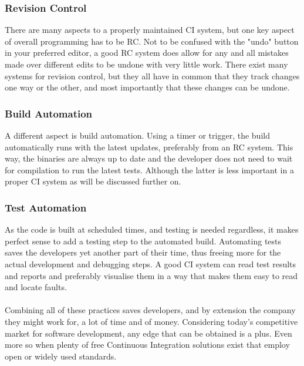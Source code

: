 \documentclass[11pt,british]{article}
\begin{document}
\subsubsection{Revision Control}
There are many aspects to a properly maintained \gls{CI} system, but one key aspect of overall programming has to be \gls{RC}. Not to be confused with the "undo" button in your preferred editor, a good \gls{RC} system does allow for any and all mistakes made over different edits to be undone with very little work. There exist many systems for revision control, but they all have in common that they track changes one way or the other, and most importantly that these changes can be undone. 

\subsubsection{Build Automation}
A different aspect is build automation. Using a timer or trigger, the build automatically runs with the latest updates, preferably from an \gls{RC} system. This way, the binaries are always up to date and the developer does not need to wait for compilation to run the latest tests. Although the latter is less important in a proper \gls{CI} system as will be discussed further on. 

\subsubsection{Test Automation}
As the code is built at scheduled times, and testing is needed regardless, it makes perfect sense to add a testing step to the automated build. Automating tests saves the developers yet another part of their time, thus freeing more for the actual development and debugging steps. A good \gls{CI} system can read test results and reports and preferably visualise them in a way that makes them easy to read and locate faults.
\\
\\
Combining all of these practices saves developers, and by extension the company they might work for, a lot of time and of money. Considering today's competitive market for software development, any edge that can be obtained is a plus. Even more so when plenty of free Continuous Integration solutions exist that employ open or widely used standards.\cite{ci1,ci2,ci3}
\end{document}
